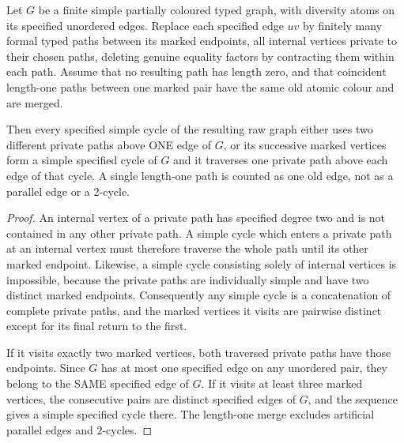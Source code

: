 \begin{lemma}
\label{lem:typed-private-path-cycle}
Let \(G\) be a finite simple partially coloured
typed graph, with diversity atoms on its specified
unordered edges. Replace each specified edge
\(uv\) by finitely many formal typed paths between
its marked endpoints, all internal vertices private
to their chosen paths, deleting genuine equality
factors by contracting them within each path.
Assume that no resulting path has length zero,
and that coincident length-one paths between
one marked pair have the same old atomic colour
and are merged.

Then every specified simple cycle of the
resulting raw graph either uses two different
private paths above ONE edge of \(G\), or its
successive marked vertices form a simple
specified cycle of \(G\) and it traverses one
private path above each edge of that cycle.
A single length-one path is counted as one
old edge, not as a parallel edge or a 2-cycle.
\end{lemma}
\begin{proof}
An internal vertex of a private path has
specified degree two and is not contained
in any other private path. A simple cycle
which enters a private path at an internal
vertex must therefore traverse the whole
path until its other marked endpoint.
Likewise, a simple cycle consisting solely
of internal vertices is impossible, because
the private paths are individually simple
and have two distinct marked endpoints.
Consequently any simple cycle is a concatenation
of complete private paths, and the marked
vertices it visits are pairwise distinct
except for its final return to the first.

If it visits exactly two marked vertices,
both traversed private paths have those
endpoints. Since \(G\) has at most one
specified edge on any unordered pair, they
belong to the SAME specified edge of \(G\).
If it visits at least three marked vertices,
the consecutive pairs are distinct specified
edges of \(G\), and the sequence gives
a simple specified cycle there.
The length-one merge excludes artificial
parallel edges and 2-cycles.
\end{proof}


